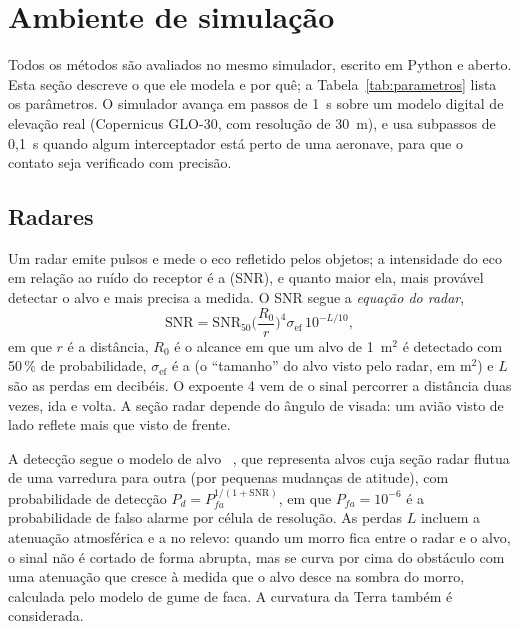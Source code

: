 \section{Ambiente de simulação}\label{sec:ambiente}

Todos os métodos são avaliados no mesmo simulador, escrito em Python e aberto. Esta seção descreve o que ele modela e por
quê; a Tabela~\ref{tab:parametros} lista os parâmetros. O simulador avança em passos de 1~s sobre um modelo digital de
elevação real (Copernicus GLO-30, com resolução de 30~m), e usa subpassos de 0,1~s quando algum interceptador está perto
de uma aeronave, para que o contato seja verificado com precisão.

\subsection{Radares}
Um radar emite pulsos e mede o eco refletido pelos objetos; a intensidade do eco em relação ao ruído do receptor é a
 (SNR), e quanto maior ela, mais provável detectar o alvo e mais precisa a medida. O SNR
segue a \emph{equação do radar},
\begin{equation}
  \mathrm{SNR}=\mathrm{SNR}_{50}\Big(\frac{R_0}{r}\Big)^4\sigma_{\mathrm{ef}}\,10^{-L/10},
\end{equation}
em que $r$ é a distância, $R_0$ é o alcance em que um alvo de 1~m$^2$ é detectado com 50\,\% de probabilidade,
$\sigma_{\mathrm{ef}}$ é a  (o ``tamanho'' do alvo visto pelo radar, em m$^2$) e $L$ são as
perdas em decibéis. O expoente 4 vem de o sinal percorrer a distância duas vezes, ida e volta. A seção radar depende do
ângulo de visada: um avião visto de lado reflete mais que visto de frente.

A detecção segue o modelo de alvo ~\cite{swerling1960}, que representa alvos cuja seção radar
flutua de uma varredura para outra (por pequenas mudanças de atitude), com probabilidade de detecção
$P_d=P_{fa}^{1/(1+\mathrm{SNR})}$, em que $P_{fa}=10^{-6}$ é a probabilidade de falso alarme por célula de resolução.
As perdas $L$ incluem a atenuação atmosférica e a  no relevo: quando um morro fica entre o radar e o
alvo, o sinal não é cortado de forma abrupta, mas se curva por cima do obstáculo com uma atenuação que cresce à medida que
o alvo desce na sombra do morro, calculada pelo modelo de gume de faca. A curvatura da Terra também é considerada.


